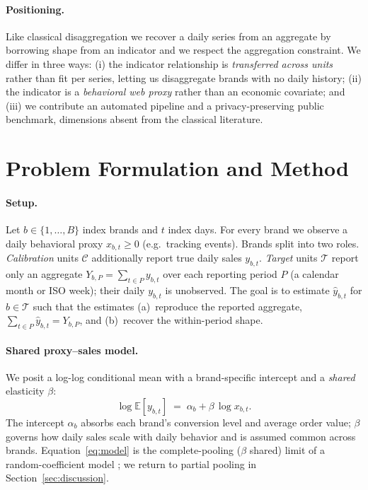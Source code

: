 \documentclass[11pt]{article}
\begin{document}
\paragraph{Positioning.}
Like classical disaggregation we recover a daily series from an aggregate by
borrowing shape from an indicator and we respect the aggregation constraint. We
differ in three ways: (i) the indicator relationship is \emph{transferred across
units} rather than fit per series, letting us disaggregate brands with no daily
history; (ii) the indicator is a \emph{behavioral web proxy} rather than an
economic covariate; and (iii) we contribute an automated pipeline and a
privacy-preserving public benchmark, dimensions absent from the classical
literature.

\section{Problem Formulation and Method}\label{sec:method}

\paragraph{Setup.}
Let $b \in \{1,\dots,B\}$ index brands and $t$ index days. For every brand we
observe a daily behavioral proxy $x_{b,t} \ge 0$ (e.g.\ tracking events). Brands
split into two roles. \emph{Calibration} units $\mathcal{C}$ additionally report
true daily sales $y_{b,t}$. \emph{Target} units $\mathcal{T}$ report only an
aggregate $Y_{b,P} = \sum_{t \in P} y_{b,t}$ over each reporting period $P$
(a calendar month or ISO week); their daily $y_{b,t}$ is unobserved. The goal is
to estimate $\hat{y}_{b,t}$ for $b \in \mathcal{T}$ such that the estimates
(a)~reproduce the reported aggregate, $\sum_{t\in P}\hat{y}_{b,t}=Y_{b,P}$, and
(b)~recover the within-period shape.

\paragraph{Shared proxy--sales model.}
We posit a log-log conditional mean with a brand-specific intercept and a
\emph{shared} elasticity $\beta$:
\begin{equation}
\log \mathbb{E}[y_{b,t}] \;=\; \alpha_b + \beta \, \log x_{b,t}.
\label{eq:model}
\end{equation}
The intercept $\alpha_b$ absorbs each brand's conversion level and average order
value; $\beta$ governs how daily sales scale with daily behavior and is assumed
common across brands. Equation~\eqref{eq:model} is the complete-pooling
($\beta$ shared) limit of a random-coefficient model \citep{Swamy1970}; we
return to partial pooling in Section~\ref{sec:discussion}.
\end{document}
